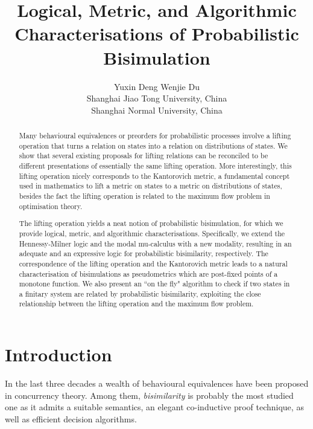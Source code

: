 \documentclass{article}
\begin{document}
\title{Logical, Metric, and Algorithmic\\ Characterisations of Probabilistic Bisimulation}
\author{
Yuxin Deng \qquad Wenjie Du\\
 Shanghai Jiao Tong University, China\\
 Shanghai Normal University, China}
\maketitle

\begin{abstract}
Many behavioural equivalences or preorders for probabilistic
processes involve a lifting operation that turns a relation on
states into a relation on distributions of states. We show that
several existing proposals for lifting relations can be reconciled
to be different presentations of essentially the same lifting
operation. More interestingly, this lifting operation nicely
corresponds to the Kantorovich metric, a fundamental concept used in
mathematics to lift a metric on states to a metric on distributions
of states, besides the fact the lifting operation is related to the
maximum flow problem in optimisation theory.

The lifting operation yields a neat notion of probabilistic
bisimulation, for which we provide logical, metric, and algorithmic
characterisations. Specifically, we extend the Hennessy-Milner logic
and the modal mu-calculus with a new modality, resulting in an
adequate and an expressive logic for probabilistic bisimilarity,
respectively. The correspondence of the lifting operation and the
Kantorovich metric leads to a natural characterisation of
bisimulations as pseudometrics which are post-fixed points of a
monotone function. We also present an ``on the fly" algorithm to
check if two states in a finitary system are related by
probabilistic bisimilarity, exploiting the close relationship
between the lifting operation and the maximum flow problem.
\end{abstract}

\section{Introduction}
In the last three decades a wealth of behavioural equivalences have
been proposed in concurrency theory. Among them, \emph{bisimilarity}
\cite{Mil89a,Par81} is probably the most studied one as it admits a
suitable semantics, an elegant co-inductive proof technique, as well
as efficient decision algorithms.
\end{document}
